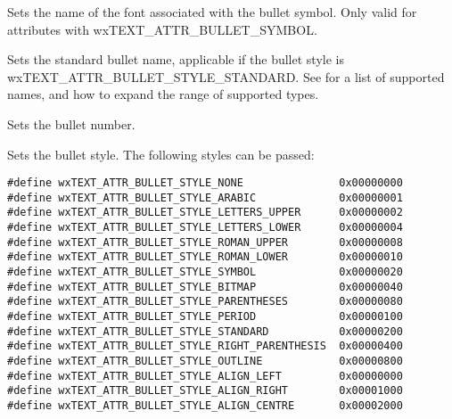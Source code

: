
Sets the name of the font associated with the bullet symbol.
Only valid for attributes with wxTEXT\_ATTR\_BULLET\_SYMBOL.

\label{wxrichtextattrsetbulletname}


Sets the standard bullet name, applicable if the bullet style is wxTEXT\_ATTR\_BULLET\_STYLE\_STANDARD.
See  for a list
of supported names, and how to expand the range of supported types.

\label{wxrichtextattrsetbulletnumber}


Sets the bullet number.

\label{wxrichtextattrsetbulletstyle}


Sets the bullet style. The following styles can be passed:

{\small
\begin{verbatim}
#define wxTEXT_ATTR_BULLET_STYLE_NONE               0x00000000
#define wxTEXT_ATTR_BULLET_STYLE_ARABIC             0x00000001
#define wxTEXT_ATTR_BULLET_STYLE_LETTERS_UPPER      0x00000002
#define wxTEXT_ATTR_BULLET_STYLE_LETTERS_LOWER      0x00000004
#define wxTEXT_ATTR_BULLET_STYLE_ROMAN_UPPER        0x00000008
#define wxTEXT_ATTR_BULLET_STYLE_ROMAN_LOWER        0x00000010
#define wxTEXT_ATTR_BULLET_STYLE_SYMBOL             0x00000020
#define wxTEXT_ATTR_BULLET_STYLE_BITMAP             0x00000040
#define wxTEXT_ATTR_BULLET_STYLE_PARENTHESES        0x00000080
#define wxTEXT_ATTR_BULLET_STYLE_PERIOD             0x00000100
#define wxTEXT_ATTR_BULLET_STYLE_STANDARD           0x00000200
#define wxTEXT_ATTR_BULLET_STYLE_RIGHT_PARENTHESIS  0x00000400
#define wxTEXT_ATTR_BULLET_STYLE_OUTLINE            0x00000800
#define wxTEXT_ATTR_BULLET_STYLE_ALIGN_LEFT         0x00000000
#define wxTEXT_ATTR_BULLET_STYLE_ALIGN_RIGHT        0x00001000
#define wxTEXT_ATTR_BULLET_STYLE_ALIGN_CENTRE       0x00002000
\end{verbatim}
}

\label{wxrichtextattrsetbullettext}

